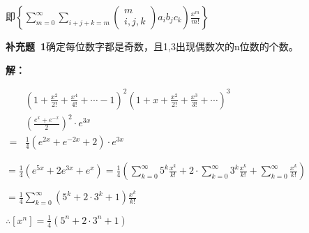 \documentclass{report}
\begin{document}
即$\left.\left\{\sum_{m=0}^{\infty} \sum_{i+j+k=m}\left(\begin{array}{c}m \\ i ,j, k\end{array}\right) a_{i} b_{j} c_{k}\right) \frac{x^{m}}{m !}\right\}$

\textbf{补充题\ 1}确定每位数字都是奇数，且1,3出现偶数次的n位数的个数。

\textbf{解：}

$\begin{aligned} &\left(1+\frac{x^{2}}{2 !}+\frac{x^{4}}{4 !}+\cdots-1\right)^{2}\left(1+x+\frac{x^{2}}{2 !}+\frac{x^{3}}{3 !}+\cdots\right)^{3} \\ &\left(\frac{e^{x}+e^{-x}}{2}\right)^{2} \cdot e^{3 x} \\=& \frac{1}{4}\left(e^{2 x}+e^{-2 x}+2\right) \cdot e^{3 x} \end{aligned}$

$=\frac{1}{4}\left(e^{5 x}+2 e^{3 x}+e^{x}\right)=\frac{1}{4}\left(\sum_{k=0}^{\infty} 5^{k} \frac{ x^{k}}{k !}+2 \cdot \sum_{k=0}^{\infty} 3^{k} \frac{ x^{k}}{k !}+\sum_{k=0}^{\infty} \frac{x^{k}}{k !}\right)$


$=\frac{1}{4} \sum_{k=0}^{\infty}\left(5^{k}+2 \cdot 3^{k}+1\right) \frac{x^{k}}{k !}$

$\therefore\left[x^{n}\right]=\frac{1}{4}\left(5^{n}+2 \cdot 3^{n}+1\right)$
\end{document}
